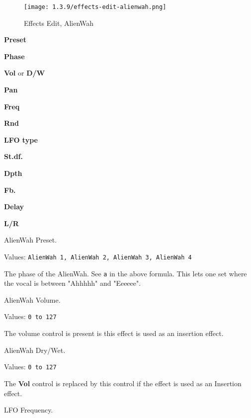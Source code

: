 \begin{figure}[H]
   \centering
   \texttt{[image: 1.3.9/effects-edit-alienwah.png]}
   \caption{Effects Edit, AlienWah}
   \label{fig:effects_edit_alienwah}
\end{figure}

   \begin{enumber}
      \item \textbf{Preset}
      \item \textbf{Phase}
      \item \textbf{Vol} or \textbf{D/W}
      \item \textbf{Pan}
      \item \textbf{Freq}
      \item \textbf{Rnd}
      \item \textbf{LFO type}
      \item \textbf{St.df.}
      \item \textbf{Dpth}
      \item \textbf{Fb.}
      \item \textbf{Delay}
      \item \textbf{L/R}
   \end{enumber}

   \setcounter{ItemCounter}{0}      %

   AlienWah Preset.

   Values: \texttt{AlienWah 1, AlienWah 2, AlienWah 3, AlienWah 4}

   The phase of the AlienWah.
   See \texttt{a} in the above formula.
   This lets one set where the vocal is between
   "Ahhhhh" and "Eeeeee".

   AlienWah Volume.

   Values: \texttt{0 to 127}

   The volume control is present is this effect is used as an insertion
   effect.

   AlienWah Dry/Wet.

   Values: \texttt{0 to 127}

   The \textbf{Vol} control is replaced by this control if the effect is
   used as an Insertion effect.

   LFO Frequency.

